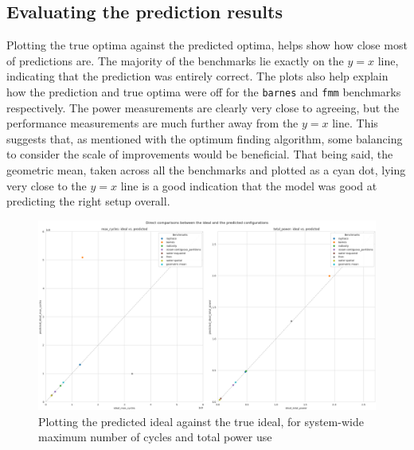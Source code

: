     \subsection{Evaluating the prediction results}
    Plotting the true optima against the predicted optima, helps show how close 
    most of predictions are. The majority of the benchmarks lie exactly on the 
    $y=x$ line, indicating that the prediction was entirely correct. The plots 
    also help explain how the prediction and true optima were off for the 
    \texttt{barnes} and \texttt{fmm} benchmarks respectively. The power 
    measurements are clearly very close to agreeing, but the performance 
    measurements are much further away from the $y=x$ line. This suggests that, 
    as mentioned with the optimum finding algorithm, some balancing to consider 
    the scale of improvements would be beneficial. That being said, the 
    geometric mean, taken across all the benchmarks and plotted as a cyan dot, 
    lying very close to the $y=x$ line is a good indication that the model was 
    good at predicting the right setup overall.
    \begin{figure}[H]
        \centering
        \includegraphics[width=\textwidth]{result-plots/stock-2b2L/system-scatter.png}
        \caption{Plotting the predicted ideal against the true ideal, for
                 system-wide maximum number of cycles and total power use}
    \end{figure}

